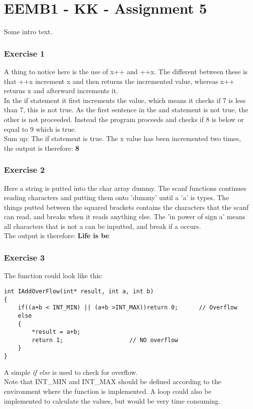 

\part*{EEMB1 - KK - Assignment 5}
Some intro text.
\section{Exercise 1}
A thing to notice here is the use of x++ and ++x. The different between these is that ++x increment x and then returns 
the incremented value, whereas x++ returns x and afterward increments it.\\
In the if statement it first increments the value, which means it checks if 7 is less than 7, this is not true. As the first sentence in the and 
statement is not true, the other is not proceeded. Instead the program proceeds and checks if 8 is below or equal to 9 which is true.\\
Sum up: The if statement is true. The x value has been incremented two times, the output is therefore: \textbf{8}
\section{Exercise 2}
Here a string is putted into the char array dummy. The scanf functions continues reading characters and putting them onto
'dummy' until a 'a' is types. The things putted between the squared brackets contains the characters that the scanf can read, 
and breaks when it reads anything else. The 'in power of sign a' means all characters that is not a can be inputted, and break if a occurs.\\
The output is therefore: \textbf{Life is be}
\section{Exercise 3}
The function could look like this:
\begin{lstlisting}
int IAddOverFlow(int* result, int a, int b)
{			
	if((a+b < INT_MIN) || (a+b >INT_MAX))return 0;		// Overflow
	else
	{
		*result = a+b;
		return 1;					// NO overflow
	}
}
\end{lstlisting}
A simple \textit{if else} is used to check for overflow.\\
Note that INT\_MIN and INT\_MAX should be defined according to the environment where the function is implemented. 
A loop could also be implemented to calculate the values, but would be very time consuming. 


